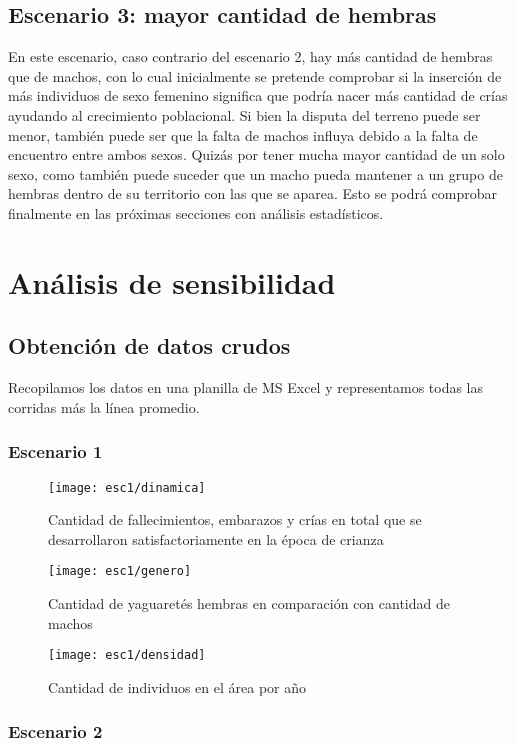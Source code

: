     \subsection{Escenario 3: mayor cantidad de hembras}
      En este escenario, caso contrario del escenario 2, hay más cantidad de hembras que de machos, con lo cual inicialmente se pretende comprobar si la inserción de más individuos de sexo femenino significa que podría nacer más cantidad de crías ayudando al crecimiento poblacional. Si bien la disputa del terreno puede ser menor, también puede ser que la falta de machos influya debido a la falta de encuentro entre ambos sexos. Quizás por tener mucha mayor cantidad de un solo sexo, como también puede suceder que un macho pueda mantener a un grupo de hembras dentro de su territorio con las que se aparea. Esto se podrá comprobar finalmente en las próximas secciones con análisis estadísticos.

    \section{Análisis de sensibilidad}

\subsection{Obtención de datos crudos}

Recopilamos los datos en una planilla de MS Excel y representamos todas las corridas más la línea promedio.

\subsubsection{Escenario 1}
\begin{figure}[H]
    \texttt{[image: esc1/dinamica]}
    \caption{Cantidad de fallecimientos, embarazos y crías en total que se desarrollaron satisfactoriamente en la época de crianza}\label{fig:fig1-1}
    \endminipage\hfill
    \texttt{[image: esc1/genero]}
    \caption{Cantidad de yaguaretés hembras en comparación con cantidad de machos}\label{fig:fig1-2}
    \endminipage\hfill
    \texttt{[image: esc1/densidad]}
    \caption{Cantidad de individuos en el área por año}\label{fig:fig1-3}
    \endminipage
\end{figure}

\subsubsection{Escenario 2}

